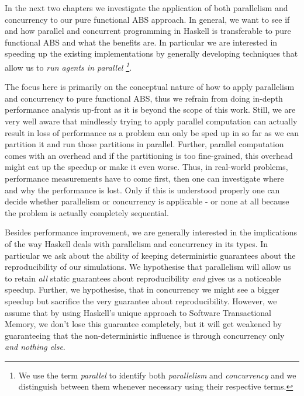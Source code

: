 In the next two chapters we investigate the application of both parallelism and concurrency to our pure functional ABS approach. In general, we want to see if and how parallel and concurrent programming in Haskell is transferable to pure functional ABS and what the benefits are. In particular we are interested in speeding up the existing implementations by generally developing techniques that allow us to  \textit{run agents in parallel \footnote{We use the term \textit{parallel} to identify both \textit{parallelism} and \textit{concurrency} and we distinguish between them whenever necessary using their respective terms.}}. 

The focus here is primarily on the conceptual nature of how to apply parallelism and concurrency to pure functional ABS, thus we refrain from doing in-depth performance analysis up-front as it is beyond the scope of this work. Still, we are very well aware that mindlessly trying to apply parallel computation can actually result in loss of performance as a problem can only be sped up in so far as we can partition it and run those partitions in parallel. Further, parallel computation comes with an overhead and if the partitioning is too fine-grained, this overhead might eat up the speedup or make it even worse. Thus, in real-world problems, performance measurements have to come first, then one can investigate where and why the performance is lost. Only if this is understood properly one can decide whether parallelism or concurrency is applicable - or none at all because the problem is actually completely sequential. %

Besides performance improvement, we are generally interested in the implications of the way Haskell deals with parallelism and concurrency in its types. In particular we ask about the ability of keeping deterministic guarantees about the reproducibility of our simulations. We hypothesise that parallelism will allow us to retain \textit{all} static guarantees about reproducibility \textit{and} gives us a noticeable speedup. Further, we hypothesise, that in concurrency we might see a bigger speedup but sacrifice the very guarantee about reproducibility. However, we assume that by using Haskell's unique approach to Software Transactional Memory, we don't lose this guarantee completely, but it will get weakened by guaranteeing that the non-deterministic influence is through concurrency only \textit{and nothing else}.



